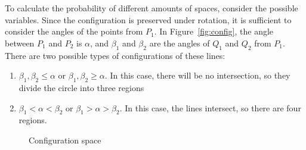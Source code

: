 \documentclass[twocolumn]{article}
\begin{document}
To calculate the probability of different amounts of spaces, consider the possible variables.
Since the configuration is preserved under rotation, it is sufficient to consider the
angles of the points from $P_1$. In Figure~\ref{fig:config}, the angle between 
$P_1$ and $P_2$ is $\alpha$, and $\beta_1$ and $\beta_2$ are the angles of $Q_1$
and $Q_2$ from $P_1$. There are two possible types of configurations of these lines:

\begin{enumerate}
    \item $\beta_1, \beta_2 \le \alpha$ or $\beta_1, \beta_2 \ge \alpha$.
          In this case, there will be no intersection, so they divide the circle into three regions
    \item $\beta_1 < \alpha < \beta_2$ or $\beta_1 > \alpha > \beta_2$.
          In this case, the lines intersect, so there are four regions.
\end{enumerate}

\begin{figure}[h]
    \centering
    \caption{Configuration space}
    \label{fig:space}
\end{figure}
\end{document}
